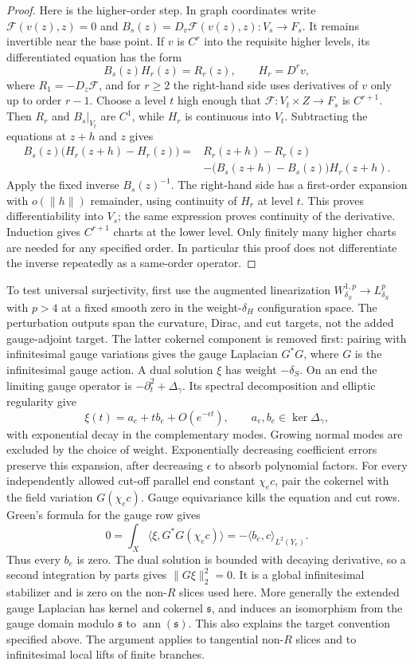 \begin{proof}
Here is the higher-order step.  In graph coordinates write
$\mathcal F(v(z),z)=0$ and
$B_s(z)=D_v\mathcal F(v(z),z):V_s\to F_s$.  It remains invertible
near the base point.  If $v$ is $C^r$ into the requisite higher levels,
its differentiated equation has the form
\[
 B_s(z)H_r(z)=R_r(z),\qquad H_r=D^rv,
\]
where $R_1=-D_z\mathcal F$, and for $r\geq2$ the right-hand side
uses derivatives of $v$ only up to order $r-1$.  Choose a level $t$
high enough that $\mathcal F:V_t\times Z\to F_s$ is $C^{r+1}$.
Then $R_r$ and $B_s|_{V_t}$ are $C^1$, while $H_r$ is continuous
into $V_t$.  Subtracting the equations at $z+h$ and $z$ gives
\begin{align*}
 B_s(z)\bigl(H_r(z+h)-H_r(z)\bigr)
  ={}&R_r(z+h)-R_r(z)\\
    &-\bigl(B_s(z+h)-B_s(z)\bigr)H_r(z+h).
\end{align*}
Apply the fixed inverse $B_s(z)^{-1}$.  The right-hand side has a
first-order expansion with $o(\|h\|)$ remainder, using continuity of
$H_r$ at level $t$.  This proves differentiability into $V_s$; the
same expression proves continuity of the derivative.  Induction gives
$C^{r+1}$ charts at the lower level.  Only finitely many higher charts
are needed for any specified order.  In particular this proof does not
differentiate the inverse repeatedly as a same-order operator.
\end{proof}

To test universal surjectivity, first use the augmented linearization
$W^{1,p}_{\delta_S}\to L^p_{\delta_S}$ with $p>4$ at a fixed smooth
zero in the weight-$\delta_H$ configuration space.
The perturbation outputs span the curvature, Dirac, and cut targets,
not the added gauge-adjoint target.  The latter cokernel component is
removed first: pairing with infinitesimal gauge variations gives the
gauge Laplacian $G^*G$, where $G$ is the infinitesimal gauge action.
A dual solution $\xi$ has weight $-\delta_S$.  On an end the
limiting gauge operator is $-\partial_t^2+\Delta_\gamma$.
Its spectral decomposition and elliptic regularity give
\[
 \xi(t)=a_e+t b_e+O(e^{-\epsilon t}),\qquad
 a_e,b_e\in\ker\Delta_\gamma,
\]
with exponential decay in the complementary modes.  Growing normal
modes are excluded by the choice of weight.  Exponentially decreasing
coefficient errors preserve this expansion, after decreasing
$\epsilon$ to absorb polynomial factors.  For every independently
allowed cut-off parallel end constant $\chi_e c$, pair the cokernel
with the field variation $G(\chi_e c)$.  Gauge equivariance kills
the equation and cut rows.  Green's formula for the gauge row gives
\[
 0=\int_X\langle\xi,G^*G(\chi_e c)\rangle
   =-\langle b_e,c\rangle_{L^2(Y_e)}.
\]
Thus every $b_e$ is zero.  The dual solution is bounded with decaying
derivative, so a second integration by parts gives
$\|G\xi\|_2^2=0$.  It is a global infinitesimal stabilizer and is
zero on the non-$R$ slices used here.  More generally the extended
gauge Laplacian has kernel and cokernel $\mathfrak s$, and induces
an isomorphism from the gauge domain modulo $\mathfrak s$ to
$\operatorname{ann}(\mathfrak s)$.  This also explains the target
convention specified above.  The argument applies to tangential
non-$R$ slices and to infinitesimal local lifts of finite branches.

